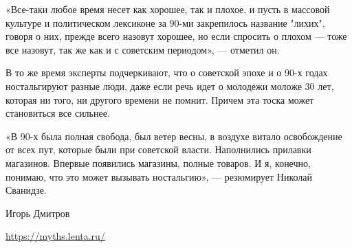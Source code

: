 «Все-таки любое время несет как хорошее, так и плохое, и пусть в массовой
культуре и политическом лексиконе за 90-ми закрепилось название "лихих", говоря
о них, прежде всего назовут хорошее, но если спросить о плохом — тоже все
назовут, так же как и с советским периодом», — отметил он.

В то же время эксперты подчеркивают, что о советской эпохе и о 90-х годах
ностальгируют разные люди, даже если речь идет о молодежи моложе 30 лет,
которая ни того, ни другого времени не помнит. Причем эта тоска может
становиться все сильнее.

«В 90-х была полная свобода, был ветер весны, в воздухе витало освобождение от
всех пут, которые были при советской власти. Наполнились прилавки магазинов.
Впервые появились магазины, полные товаров. И я, конечно, понимаю, что это
может вызывать ностальгию», — резюмирует Николай Сванидзе.

Игорь Дмитров

\url{https://myths.lenta.ru/}

